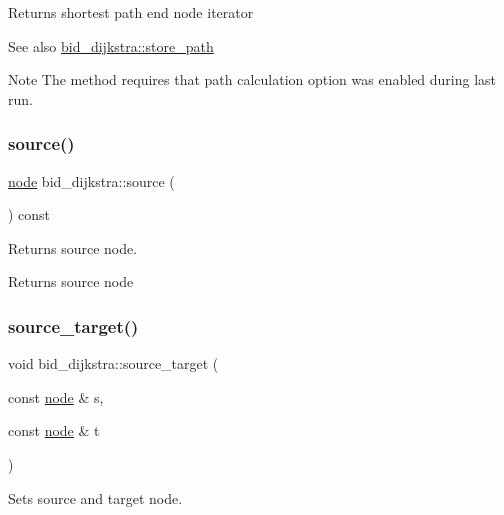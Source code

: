 \begin{DoxyReturn}{Returns}
shortest path end node iterator
\end{DoxyReturn}
\begin{DoxySeeAlso}{See also}
\mbox{\hyperlink{classbid__dijkstra_a0032d9b44c8b3f6f5733ff3ef94cf169}{bid\+\_\+dijkstra\+::store\+\_\+path}}
\end{DoxySeeAlso}
\begin{DoxyNote}{Note}
The method requires that path calculation option was enabled during last run. 
\end{DoxyNote}
\mbox{\label{classbid__dijkstra_ae8f5268e008b003e38f25c83ed3fd138}} 
\subsubsection{\texorpdfstring{source()}{source()}}
{\footnotesize\ttfamily \mbox{\hyperlink{classnode}{node}} bid\+\_\+dijkstra\+::source (\begin{DoxyParamCaption}{ }\end{DoxyParamCaption}) const}



Returns source node. 

\begin{DoxyReturn}{Returns}
source node 
\end{DoxyReturn}
\mbox{\label{classbid__dijkstra_a25dfbd432043e2e642e4dc71f4cb3208}} 
\subsubsection{\texorpdfstring{source\+\_\+target()}{source\_target()}}
{\footnotesize\ttfamily void bid\+\_\+dijkstra\+::source\+\_\+target (\begin{DoxyParamCaption}\item[{const \mbox{\hyperlink{classnode}{node}} \&}]{s,  }\item[{const \mbox{\hyperlink{classnode}{node}} \&}]{t }\end{DoxyParamCaption})}



Sets source and target node. 


